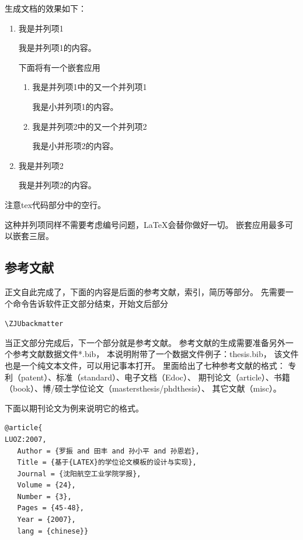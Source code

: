 生成文档的效果如下：

\begin{enumerate}
\item{我是并列项1}

我是并列项1的内容。

下面将有一个嵌套应用

\begin{enumerate}
\item{我是并列项1中的又一个并列项1}

我是小并列项1的内容。

\item{我是并列项2中的又一个并列项2}

我是小并形项2的内容。

\end{enumerate}
\item{我是并列项2}

我是并列项2的内容。

\end{enumerate}

\vspace{8pt}

注意tex代码部分中的空行。

这种并列项同样不需要考虑编号问题，\LaTeX 会替你做好一切。
嵌套应用最多可以嵌套三层。

\subsection{参考文献}

正文自此完成了，下面的内容是后面的参考文献，索引，简历等部分。
先需要一个命令告诉软件正文部分结束，开始文后部分

\verb+\ZJUbackmatter+

当正文部分完成后，下一个部分就是参考文献。
参考文献的生成需要准备另外一个参考文献数据文件*.bib，
本说明附带了一个数据文件例子：thesis.bib，
该文件也是一个纯文本文件，可以用记事本打开。
里面给出了七种参考文献的格式：
专利（patent）、标准（standard）、电子文档（Edoc）、
期刊论文（article）、书籍（book）、博/硕士学位论文（mastersthesis/phdthesis）、
其它文献（misc）。

下面以期刊论文为例来说明它的格式。

{
\linespread{1}
\noindent
\begin{verbatim}
@article{
LUOZ:2007,
   Author = {罗振 and 田丰 and 孙小平 and 孙恩岩},
   Title = {基于{LATEX}的学位论文模板的设计与实现},
   Journal = {沈阳航空工业学院学报},
   Volume = {24},
   Number = {3},
   Pages = {45-48},
   Year = {2007},
   lang = {chinese}}
\end{verbatim}
}

